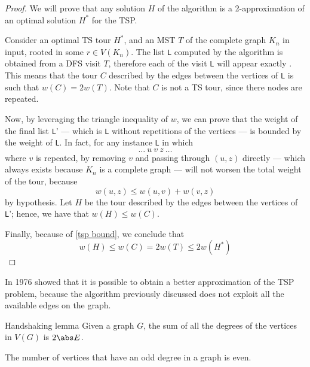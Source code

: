 \documentclass[a4paper, 12pt]{report}
\begin{document}
    \begin{proof}
        We will prove that any solution $H$ of the algorithm is a 2-approximation of an optimal solution $H^*$ for the TSP.

        Consider an optimal TS tour $H^*$, and an MST $T$ of the complete graph $K_n$ in input, rooted in some $r \in V(K_n)$. The list \texttt L computed by the algorithm is obtained from a  DFS visit $T$, therefore each  of the visit \texttt L will appear exactly . This means that the tour $C$ described by the edges between the vertices of \texttt L is such that $w(C) = 2 w(T)$. Note that $C$ is not a TS tour, since there nodes are repeated.

        Now, by leveraging the triangle inequality of $w$, we can prove that the weight of the final list \texttt L' --- which is \texttt L without repetitions of the vertices --- is bounded by the weight of \texttt L. In fact, for any instance \texttt L in which $$\ldots \ u \ v \ z \ \ldots$$ where $v$ is repeated, by removing $v$ and passing through $(u, z)$ directly --- which always exists because $K_n$ is a complete graph --- will not worsen the total weight of the tour, because $$w(u, z) \le w(u, v) + w(v, z)$$ by hypothesis. Let $H$ be the tour described by the edges between the vertices of \texttt L'; hence, we have that $w(H) \le w(C)$.

        Finally, because of \cref{tsp bound}, we conclude that $$w(H) \le w(C) = 2w(T) \le 2w(H^*)$$
    \end{proof}

    In 1976 \textcite{christofides} showed that it is possible to obtain a better approximation of the TSP problem, because the algorithm previously discussed does not exploit all the available edges on the graph.

    \begin{framedlem}[label={handshaking lemma}]{Handshaking lemma}
        Given a graph $G$, the sum of all the degrees of the vertices in $V(G)$ is $2 \abs E$.
    \end{framedlem}

    \begin{framedcor}[label={odd even}]{}
        The number of vertices that have an odd degree in a graph is even.
    \end{framedcor}
\end{document}

